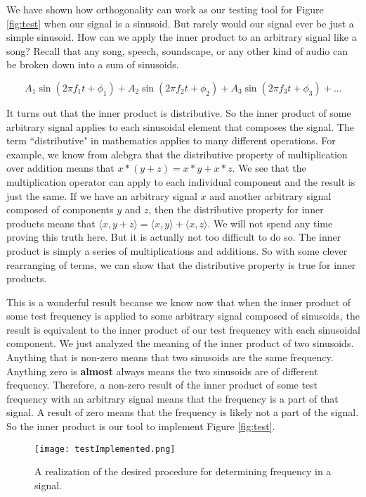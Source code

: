 	We have shown how orthogonality can work as our testing tool for Figure \ref{fig:test} when
our signal is a sinusoid.  But rarely would our signal ever be just a simple sinusoid.  How can
we apply the inner product to an arbitrary signal like a song?  Recall that
any song, speech, soundscape, or any other kind of audio can be broken down into a sum of sinusoids.

$$A_1\sin(2\pi f_1 t + \phi_1) + A_2\sin(2 \pi f_2 t + \phi_2) + A_3\sin(2 \pi f_3 t + \phi_3) + ...$$

It turns out that the inner product is distributive.  So the inner product of some arbitrary signal applies
to each sinusoidal element that composes the signal.  The term ``distributive" in mathematics applies
to many different operations.  For example, we know from alebgra that the distributive property of 
multiplication over addition means that $x * (y + z) = x * y + x * z$.  We see that the multiplication operator can apply
to each individual component and the result is just the same.  If we have an arbitrary signal $x$ and another
arbitrary signal composed of components $y$ and $z$, then the distributive property for inner products 
means that  $\langle x, y + z \rangle = \langle x, y \rangle + \langle x, z \rangle$.  We will not spend any
time proving this truth here.  But it is actually not too difficult to do so.  The inner product is simply a
series of multiplications and additions.  So with some clever rearranging of terms, we can show that 
the distributive property is true for inner products.  

This is a wonderful result because we know now that when the inner product of some test frequency is 
applied to some arbitrary signal composed of sinusoids, the result is equivalent to the inner product of
our test frequency with each sinusoidal component.  We just analyzed the meaning of the inner product
of two sinusoids.  Anything that is non-zero means that two sinusoids are the same frequency.  Anything
zero is \textbf{almost} always means the two sinusoids are of different frequency.  Therefore, a non-zero result
of the inner product of some test frequency with an arbitrary signal means that the frequency is a part of that
signal.  A result of zero means that the frequency is likely not a part of the signal.  So the inner product
is our tool to implement Figure \ref{fig:test}.  

\begin{figure}[h]
	\caption{A realization of the desired procedure for determining frequency in a signal.}
	\centering
	\texttt{[image: testImplemented.png]}
	\label{fig:testImplemented}
\end{figure}

